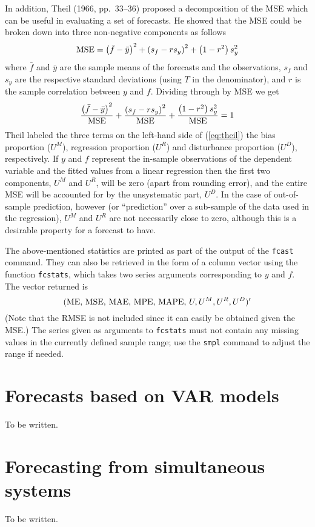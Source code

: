 In addition, Theil (1966, pp.\ 33--36) proposed a decomposition of the
MSE which can be useful in evaluating a set of forecasts.  He showed
that the MSE could be broken down into three non-negative components
as follows
%
\[
{\rm MSE} = \left(\bar{f}-\bar{y}\right)^2 + 
  \left(s_f - rs_y\right)^2 + 
  \left(1-r^2\right) s_y^2
\]
%
where $\bar{f}$ and $\bar{y}$ are the sample means of the forecasts
and the observations, $s_f$ and $s_y$ are the respective standard
deviations (using $T$ in the denominator), and $r$ is the sample
correlation between $y$ and $f$.  Dividing through by MSE we get
%
\begin{equation}
\label{eq:theil}
\frac{\left(\bar{f}-\bar{y}\right)^2}{\rm MSE} +
\frac{\left(s_f - rs_y\right)^2}{\rm MSE} + 
\frac{\left(1-r^2\right) s_y^2}{\rm MSE} = 1
\end{equation}
%
Theil labeled the three terms on the left-hand side of
(\ref{eq:theil}) the bias proportion ($U^M$), regression proportion
($U^R$) and disturbance proportion ($U^D$), respectively. If $y$ and
$f$ represent the in-sample observations of the dependent variable and
the fitted values from a linear regression then the first two
components, $U^M$ and $U^R$, will be zero (apart from rounding error),
and the entire MSE will be accounted for by the unsystematic part,
$U^D$.  In the case of out-of-sample prediction, however (or
``prediction'' over a sub-sample of the data used in the regression),
$U^M$ and $U^R$ are not necessarily close to zero, although this is a
desirable property for a forecast to have.

The above-mentioned statistics are printed as part of the output of
the \texttt{fcast} command.  They can also be retrieved in the form of
a column vector using the function \texttt{fcstats}, which takes two
series arguments corresponding to $y$ and $f$.  The vector returned is
%
\[
({\rm ME},\, {\rm MSE},\, {\rm MAE},\, {\rm MPE},\, {\rm MAPE},\, U, U^M, U^R, U^D)'
\]
%
(Note that the RMSE is not included since it can easily be obtained
given the MSE.)  The series given as arguments to \texttt{fcstats}
must not contain any missing values in the currently defined sample
range; use the \texttt{smpl} command to adjust the range if needed.

\section{Forecasts based on VAR models}
\label{sec:fcast-VAR}

To be written.

\section{Forecasting from simultaneous systems}
\label{sec:fcast-system}

To be written.

    
